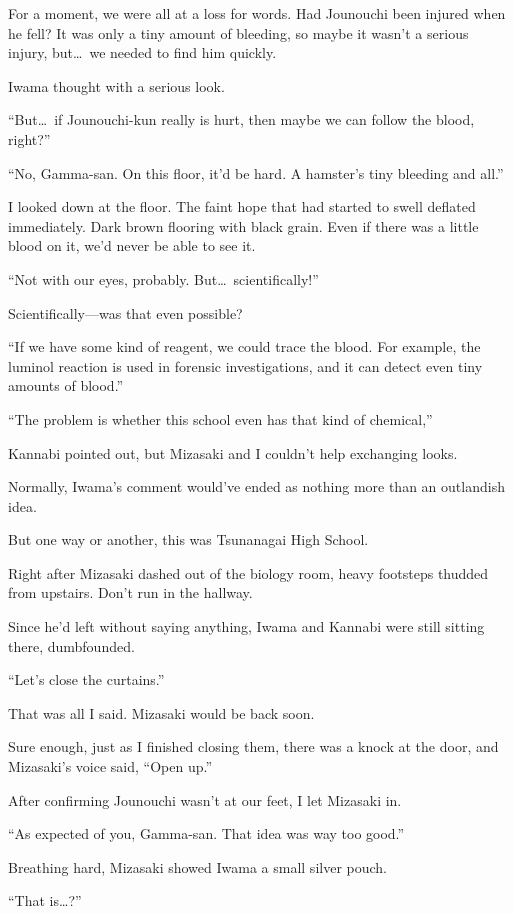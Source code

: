 \documentclass[
    a4paper,
    12pt,
    twoside,
    openany,
    UTF8,
    fontset=windows
]{ctexbook}
\begin{document}
For a moment, we were all at a loss for words. Had Jounouchi been injured when he fell? It was only a tiny amount of bleeding, so maybe it wasn't a serious injury, but\dots\ we needed to find him quickly.

Iwama thought with a serious look.

``But\dots\ if Jounouchi-kun really is hurt, then maybe we can follow the blood, right?''

``No, Gamma-san. On this floor, it'd be hard. A hamster's tiny bleeding and all.''

I looked down at the floor. The faint hope that had started to swell deflated immediately. Dark brown flooring with black grain. Even if there was a little blood on it, we'd never be able to see it.

``Not with our eyes, probably. But\dots\ scientifically!''

Scientifically---was that even possible?

``If we have some kind of reagent, we could trace the blood. For example, the luminol reaction is used in forensic investigations, and it can detect even tiny amounts of blood.''

``The problem is whether this school even has that kind of chemical,''

Kannabi pointed out, but Mizasaki and I couldn't help exchanging looks.

Normally, Iwama's comment would've ended as nothing more than an outlandish idea.

But one way or another, this was Tsunanagai High School.

Right after Mizasaki dashed out of the biology room, heavy footsteps thudded from upstairs. Don't run in the hallway.

Since he'd left without saying anything, Iwama and Kannabi were still sitting there, dumbfounded.

``Let's close the curtains.''

That was all I said. Mizasaki would be back soon.

Sure enough, just as I finished closing them, there was a knock at the door, and Mizasaki's voice said, ``Open up.''

After confirming Jounouchi wasn't at our feet, I let Mizasaki in.

``As expected of you, Gamma-san. That idea was way too good.''

Breathing hard, Mizasaki showed Iwama a small silver pouch.

``That is\dots?''
\end{document}

